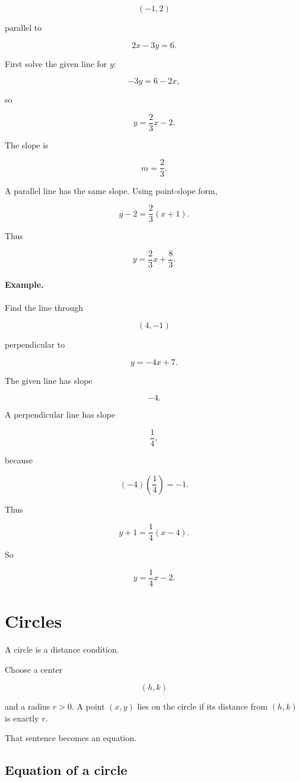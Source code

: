\[
(-1,2)
\]

parallel to

\[
2x-3y=6.
\]

First solve the given line for \(y\):

\[
-3y=6-2x,
\]

so

\[
y=\frac23x-2.
\]

The slope is

\[
m=\frac23.
\]

A parallel line has the same slope.  Using point-slope form,

\[
y-2=\frac23(x+1).
\]

Thus

\[
\boxed{
y=\frac23x+\frac83.
}
\]

\paragraph{Example.}
Find the line through

\[
(4,-1)
\]

perpendicular to

\[
y=-4x+7.
\]

The given line has slope

\[
-4.
\]

A perpendicular line has slope

\[
\frac14,
\]

because

\[
(-4)\left(\frac14\right)=-1.
\]

Thus

\[
y+1=\frac14(x-4).
\]

So

\[
\boxed{
y=\frac14x-2.
}
\]

\section{Circles}
\label{appsec:circles}

A circle is a distance condition.

Choose a center

\[
(h,k)
\]

and a radius \(r>0\).  A point \((x,y)\) lies on the circle if its distance from
\((h,k)\) is exactly \(r\).

That sentence becomes an equation.

\subsection{Equation of a circle}
\label{appsubsec:equation-circle}

